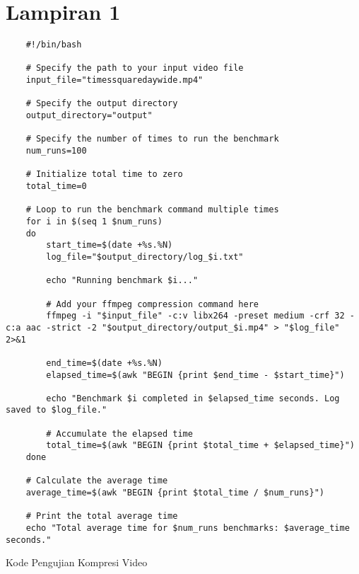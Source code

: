 \chapter*{Lampiran 1}

\begin{listing}[H]
    \begin{verbatim}
    #!/bin/bash

    # Specify the path to your input video file
    input_file="timessquaredaywide.mp4"

    # Specify the output directory
    output_directory="output"

    # Specify the number of times to run the benchmark
    num_runs=100

    # Initialize total time to zero
    total_time=0

    # Loop to run the benchmark command multiple times
    for i in $(seq 1 $num_runs)
    do
        start_time=$(date +%s.%N)
        log_file="$output_directory/log_$i.txt"
        
        echo "Running benchmark $i..."
        
        # Add your ffmpeg compression command here
        ffmpeg -i "$input_file" -c:v libx264 -preset medium -crf 32 -c:a aac -strict -2 "$output_directory/output_$i.mp4" > "$log_file" 2>&1
        
        end_time=$(date +%s.%N)
        elapsed_time=$(awk "BEGIN {print $end_time - $start_time}")
        
        echo "Benchmark $i completed in $elapsed_time seconds. Log saved to $log_file."
        
        # Accumulate the elapsed time
        total_time=$(awk "BEGIN {print $total_time + $elapsed_time}")
    done

    # Calculate the average time
    average_time=$(awk "BEGIN {print $total_time / $num_runs}")

    # Print the total average time
    echo "Total average time for $num_runs benchmarks: $average_time seconds."
    \end{verbatim}
    \caption{Kode Pengujian Kompresi Video}
    \label{code:kode_pengujian_kompresi_video}
\end{listing}

